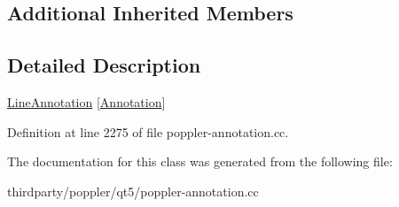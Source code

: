 \subsection*{Additional Inherited Members}


\subsection{Detailed Description}
\hyperlink{class_poppler_1_1_line_annotation}{Line\+Annotation} \mbox{[}\hyperlink{class_poppler_1_1_annotation}{Annotation}\mbox{]} 

Definition at line 2275 of file poppler-\/annotation.\+cc.



The documentation for this class was generated from the following file\+:\begin{DoxyCompactItemize}
\item 
thirdparty/poppler/qt5/poppler-\/annotation.\+cc\end{DoxyCompactItemize}

